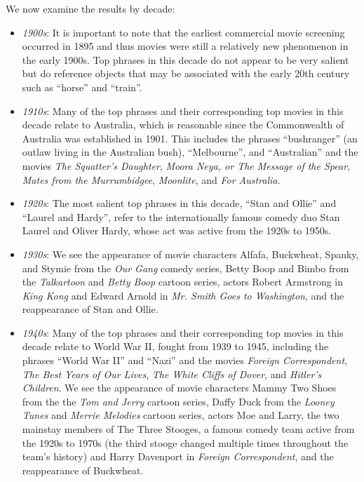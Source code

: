 \documentclass{article}
\begin{document}
\begin{multicols}{2}
We now examine the results by decade:
\begin{itemize}
    \item \textit{1900s}: It is important to note that the earliest commercial movie screening occurred in 1895 and thus movies were still a relatively new phenomenon in the early 1900s. Top phrases in this decade do not appear to be very salient but do reference objects that may be associated with the early 20th century such as ``horse'' and ``train''.
    \item \textit{1910s}: Many of the top phrases and their corresponding top movies in this decade relate to Australia, which is reasonable since the Commonwealth of Australia was established in 1901. This includes the phrases ``bushranger'' (an outlaw living in the Australian bush), ``Melbourne'', and ``Australian'' and the movies \textit{The Squatter's Daughter}, \textit{Moora Neya, or The Message of the Spear}, \textit{Mates from the Murrumbidgee}, \textit{Moonlite}, and \textit{For Australia}.
    \item \textit{1920s}: The most salient top phrases in this decade, ``Stan and Ollie'' and ``Laurel and Hardy'', refer to the internationally famous comedy duo Stan Laurel and Oliver Hardy, whose act was active from the 1920s to 1950s.
    \item \textit{1930s}: We see the appearance of movie characters Alfafa, Buckwheat, Spanky, and Stymie from the \textit{Our Gang} comedy series, Betty Boop and Bimbo from the \textit{Talkartoon} and \textit{Betty Boop} cartoon series, actors Robert Armstrong in \textit{King Kong} and Edward Arnold in \textit{Mr. Smith Goes to Washington}, and the reappearance of Stan and Ollie.
    \item \textit{1940s}: Many of the top phrases and their corresponding top movies in this decade relate to World War II, fought from 1939 to 1945, including the phrases ``World War II'' and ``Nazi'' and the movies \textit{Foreign Correspondent}, \textit{The Best Years of Our Lives}, \textit{The White Cliffs of Dover}, and \textit{Hitler's Children}. We see the appearance of movie characters Mammy Two Shoes from the the \textit{Tom and Jerry} cartoon series, Daffy Duck from the \textit{Looney Tunes} and \textit{Merrie Melodies} cartoon series, actors Moe and Larry, the two mainstay members of The Three Stooges, a famous comedy team active from the 1920s to 1970s (the third stooge changed multiple times throughout the team's history) and Harry Davenport in \textit{Foreign Correspondent}, and the reappearance of Buckwheat.

\end{itemize}
\end{multicols}
\end{document}
